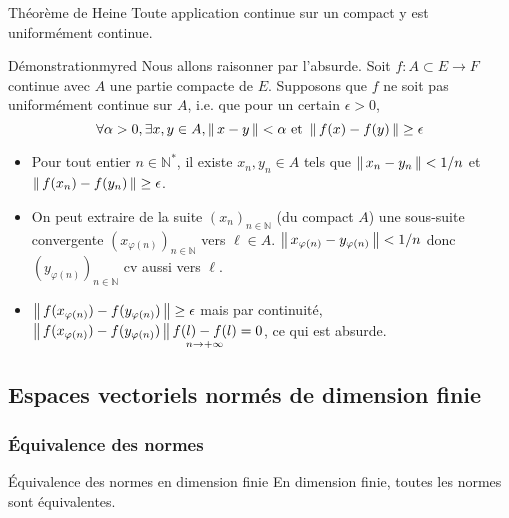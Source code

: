     \begin{theo}{Théorème de Heine}{}
        Toute application continue sur un compact y est uniformément continue.
    \end{theo}

    \begin{demo}{Démonstration}{myred}
        Nous allons raisonner par l’absurde. Soit $f : A \subset E \rightarrow F$ continue avec $A$ une partie compacte de $E$. Supposons que $f$ ne soit pas uniformément continue sur $A$, i.e. que pour un certain $\epsilon > 0$, 
        \[ \forall \alpha > 0, \exists x,y \in A, \left\lVert\,x-y\,\right\rVert < \alpha \text{ et } \left\lVert\,f(x) - f(y)\,\right\rVert \geq \epsilon \] 
        \begin{itemize}
            \item Pour tout entier $n \in \mathbb{N}^*$, il existe $x_n, y_n \in A$ tels que $\left\lVert\,x_n - y_n\,\right\rVert < 1/n$ et $\left\lVert\,f(x_n) - f(y_n)\,\right\rVert \geq \epsilon$.
            \item On peut extraire de la suite $(x_n)_{n \in \mathbb{N}}$ (du compact $A$) une sous-suite convergente $\left(x_{\varphi(n)}\right)_{n \in \mathbb{N}}$ vers $\ell \in A$. $\left\lVert\,x_{\varphi(n)} - y_{\varphi(n)}\,\right\rVert < 1/n$ donc $\left(y_{\varphi(n)}\right)_{n \in \mathbb{N}}$ cv aussi vers $\ell$.
            \item $\left\lVert\,f(x_{\varphi(n)}) - f(y_{\varphi(n)})\,\right\rVert \geq \epsilon$ mais par continuité, $\left\lVert\,f(x_{\varphi(n)}) - f(y_{\varphi(n)})\,\right\rVert \underset{n \rightarrow + \infty}{f(l)-f(l)} = 0$, ce qui est absurde.
        \end{itemize}
    \end{demo}

\subsection{Espaces vectoriels normés de dimension finie}

    \subsubsection{Équivalence des normes}

    \begin{theo}{Équivalence des normes en dimension finie}
        En dimension finie, toutes les normes sont équivalentes.
    \end{theo}

